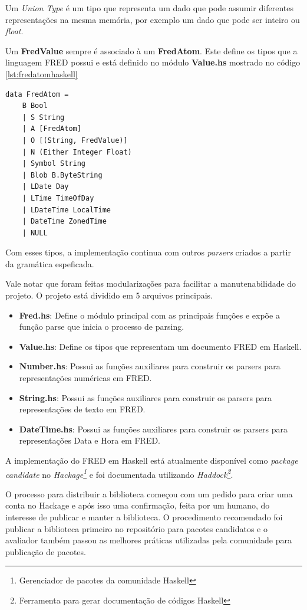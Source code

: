 Um \textit{Union Type} é um tipo que representa um dado que pode assumir diferentes 
representações na mesma memória, por exemplo um dado que pode ser inteiro ou \textit{float}.

Um \textbf{FredValue} sempre é associado à um \textbf{FredAtom}. Este
define os tipos que a linguagem FRED possui e está definido no módulo \textbf{Value.hs}
mostrado no código \ref{lst:fredatomhaskell}

\begin{lstlisting}[caption=Definição do tipo FredAtom,label={lst:fredatomhaskell}]
data FredAtom =
    B Bool
    | S String
    | A [FredAtom]
    | O [(String, FredValue)]
    | N (Either Integer Float)
    | Symbol String
    | Blob B.ByteString
    | LDate Day
    | LTime TimeOfDay
    | LDateTime LocalTime
    | DateTime ZonedTime
    | NULL
\end{lstlisting}

Com esses tipos, a implementação continua com outros \textit{parsers} criados a partir da gramática
espeficada.

Vale notar que foram feitas modularizações para facilitar a manutenabilidade do projeto.
O projeto está dividido em 5 arquivos principais. 

\begin{itemize}
    \item \textbf{Fred.hs}: Define o módulo principal com as principais funções e expõe a 
    função parse que inicia o processo de parsing.
    \item \textbf{Value.hs}: Define os tipos que representam um documento FRED em Haskell.
    \item \textbf{Number.hs}: Possui as funções auxiliares para construir os parsers para
    representações numéricas em FRED.
    \item \textbf{String.hs}: Possui as funções auxiliares para construir os parsers para
    representações de texto em FRED.
    \item \textbf{DateTime.hs}: Possui as funções auxiliares para construir os parsers para
    representações Data e Hora em FRED.
\end{itemize}

A implementação do FRED em Haskell está atualmente disponível como \textit{package candidate} no 
\textit{Hackage\footnote{Gerenciador de pacotes da comunidade Haskell}} e foi documentada utilizando 
\textit{Haddock\footnote{Ferramenta para gerar documentação de códigos Haskell}}.

O processo para distribuir a biblioteca começou com um pedido para criar uma conta no Hackage 
e após isso uma confirmação, feita por um humano, do interesse de publicar e manter a biblioteca.
O procedimento recomendado foi publicar a biblioteca primeiro no repositório para pacotes candidatos
e o avaliador também passou as melhores práticas utilizadas pela comunidade para publicação de pacotes.

